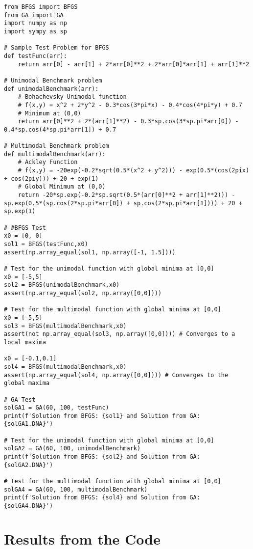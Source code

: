 \documentclass[12pt,a4paper,oneside]{paper} %
\begin{document}
\begin{verbatim}
from BFGS import BFGS
from GA import GA
import numpy as np
import sympy as sp

# Sample Test Problem for BFGS
def testFunc(arr):
    return arr[0] - arr[1] + 2*arr[0]**2 + 2*arr[0]*arr[1] + arr[1]**2

# Unimodal Benchmark problem
def unimodalBenchmark(arr):
    # Bohachevsky Unimodal function
    # f(x,y) = x^2 + 2*y^2 - 0.3*cos(3*pi*x) - 0.4*cos(4*pi*y) + 0.7
    # Minimum at (0,0)
    return arr[0]**2 + 2*(arr[1]**2) - 0.3*sp.cos(3*sp.pi*arr[0]) - 0.4*sp.cos(4*sp.pi*arr[1]) + 0.7

# Multimodal Benchmark problem
def multimodalBenchmark(arr):
    # Ackley Function
    # f(x,y) = -20exp(-0.2*sqrt(0.5*(x^2 + y^2))) - exp(0.5*(cos(2pix) + cos(2piy))) + 20 + exp(1)
    # Global Minimum at (0,0)
    return -20*sp.exp(-0.2*sp.sqrt(0.5*(arr[0]**2 + arr[1]**2))) - sp.exp(0.5*(sp.cos(2*sp.pi*arr[0]) + sp.cos(2*sp.pi*arr[1]))) + 20 + sp.exp(1)

# #BFGS Test
x0 = [0, 0]
sol1 = BFGS(testFunc,x0)
assert(np.array_equal(sol1, np.array([-1, 1.5])))

# Test for the unimodal function with global minima at [0,0]
x0 = [-5,5]
sol2 = BFGS(unimodalBenchmark,x0)
assert(np.array_equal(sol2, np.array([0,0])))

# Test for the multimodal function with global minima at [0,0]
x0 = [-5,5]
sol3 = BFGS(multimodalBenchmark,x0)
assert(not np.array_equal(sol3, np.array([0,0]))) # Converges to a local maxima

x0 = [-0.1,0.1]
sol4 = BFGS(multimodalBenchmark,x0)
assert(np.array_equal(sol4, np.array([0,0]))) # Converges to the global maxima

# GA Test
solGA1 = GA(60, 100, testFunc)
print(f'Solution from BFGS: {sol1} and Solution from GA: {solGA1.DNA}')

# Test for the unimodal function with global minima at [0,0]
solGA2 = GA(60, 100, unimodalBenchmark)
print(f'Solution from BFGS: {sol2} and Solution from GA: {solGA2.DNA}')

# Test for the multimodal function with global minima at [0,0]
solGA4 = GA(60, 100, multimodalBenchmark)
print(f'Solution from BFGS: {sol4} and Solution from GA: {solGA4.DNA}')
\end{verbatim}

\section{Results from the Code}
\end{document}
